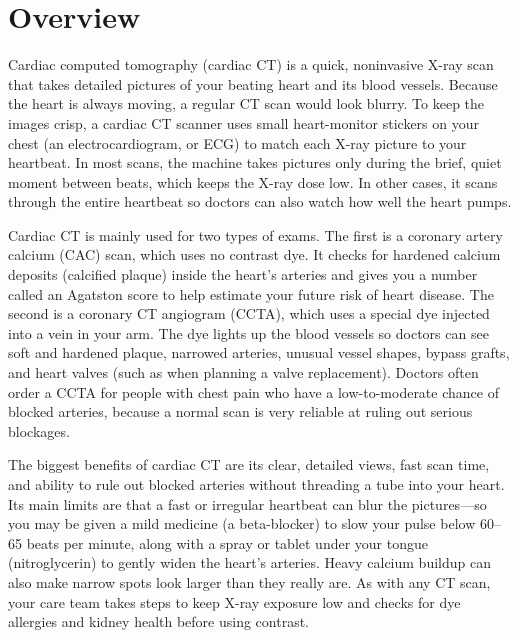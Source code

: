 \label{ch:infographic-cardiac-ct}

\section{Overview}

Cardiac computed tomography (cardiac CT) is a quick, noninvasive X-ray scan that takes detailed pictures of your beating heart and its blood vessels. Because the heart is always moving, a regular CT scan would look blurry. To keep the images crisp, a cardiac CT scanner uses small heart-monitor stickers on your chest (an electrocardiogram, or ECG) to match each X-ray picture to your heartbeat. In most scans, the machine takes pictures only during the brief, quiet moment between beats, which keeps the X-ray dose low. In other cases, it scans through the entire heartbeat so doctors can also watch how well the heart pumps.

Cardiac CT is mainly used for two types of exams. The first is a coronary artery calcium (CAC) scan, which uses no contrast dye. It checks for hardened calcium deposits (calcified plaque) inside the heart's arteries and gives you a number called an Agatston score to help estimate your future risk of heart disease. The second is a coronary CT angiogram (CCTA), which uses a special dye injected into a vein in your arm. The dye lights up the blood vessels so doctors can see soft and hardened plaque, narrowed arteries, unusual vessel shapes, bypass grafts, and heart valves (such as when planning a valve replacement). Doctors often order a CCTA for people with chest pain who have a low-to-moderate chance of blocked arteries, because a normal scan is very reliable at ruling out serious blockages.

The biggest benefits of cardiac CT are its clear, detailed views, fast scan time, and ability to rule out blocked arteries without threading a tube into your heart. Its main limits are that a fast or irregular heartbeat can blur the pictures---so you may be given a mild medicine (a beta-blocker) to slow your pulse below 60--65 beats per minute, along with a spray or tablet under your tongue (nitroglycerin) to gently widen the heart's arteries. Heavy calcium buildup can also make narrow spots look larger than they really are. As with any CT scan, your care team takes steps to keep X-ray exposure low and checks for dye allergies and kidney health before using contrast.

